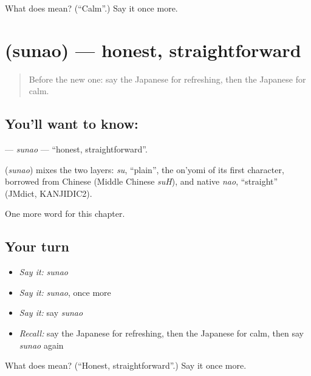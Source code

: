 \begin{tcolorbox}[breakable,colback=teal!4,colframe=teal!35!black,title={Before you move on}]
What does  mean? (\textquotedblleft{}Calm\textquotedblright{}.) Say it once more.
\end{tcolorbox}
\section[\texorpdfstring{\ja{すなお} (sunao)}{すなお (sunao)}]{ (sunao) — honest, straightforward}

\label{lesson:JA-C127-sunao}



\begin{quote}
Before the new one: say the Japanese for refreshing, then the Japanese for calm.
\end{quote}

\subsection*{You'll want to know: }
\textbf{} — \emph{sunao} — \textquotedblleft{}honest, straightforward\textquotedblright{}.

\begin{cousinweb}
\textbf{} (\emph{sunao}) mixes the two layers: \emph{su}, \textquotedblleft{}plain\textquotedblright{}, the on'yomi of its first character, borrowed from Chinese (Middle Chinese \emph{suH}), and native \emph{nao}, \textquotedblleft{}straight\textquotedblright{} (JMdict, KANJIDIC2).
\end{cousinweb}

\begin{grammarlens}[title={What you've built}]
One more word for this chapter.
\end{grammarlens}

\subsection*{Your turn}
\begin{itemize}
\raggedright
  \item \emph{Say it:} \emph{sunao}
  \item \emph{Say it:} \emph{sunao}, once more
  \item \emph{Say it:} say \emph{sunao}
  \item \emph{Recall:} say the Japanese for refreshing, then the Japanese for calm, then say \emph{sunao} again
\end{itemize}

\begin{tcolorbox}[breakable,colback=teal!4,colframe=teal!35!black,title={Before you move on}]
What does  mean? (\textquotedblleft{}Honest, straightforward\textquotedblright{}.) Say it once more.
\end{tcolorbox}
